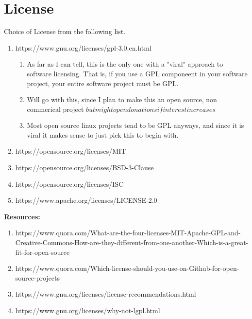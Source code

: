 \section{License}


Choice of License from the following list.




\begin{enumerate}
	\item https://www.gnu.org/licenses/gpl-3.0.en.html
	\begin{enumerate}
		\item As far as I can tell, this is the only one with a "viral" approach to software licensing. That is, if you use a GPL componeent in your software project, your entire software project must be GPL.
		\item Will go with this, since I plan to make this an open source, non commerical project \(but might open donations if interest increases\)
		\item Most open source linux projects tend to be GPL anyways, and since it is viral it makes sense to just pick this to begin with.
	\end{enumerate}
	\item https://opensource.org/licenses/MIT
	\item https://opensource.org/licenses/BSD-3-Clause
	\item https://opensource.org/licenses/ISC
	\item https://www.apache.org/licenses/LICENSE-2.0
\end{enumerate}


\textbf{Resources:}
\begin{enumerate}
	\item https://www.quora.com/What-are-the-four-licenses-MIT-Apache-GPL-and-Creative-Commons-How-are-they-different-from-one-another-Which-is-a-great-fit-for-open-source
	\item https://www.quora.com/Which-license-should-you-use-on-Github-for-open-source-projects
	\item https://www.gnu.org/licenses/license-recommendations.html
	\item https://www.gnu.org/licenses/why-not-lgpl.html
\end{enumerate}

